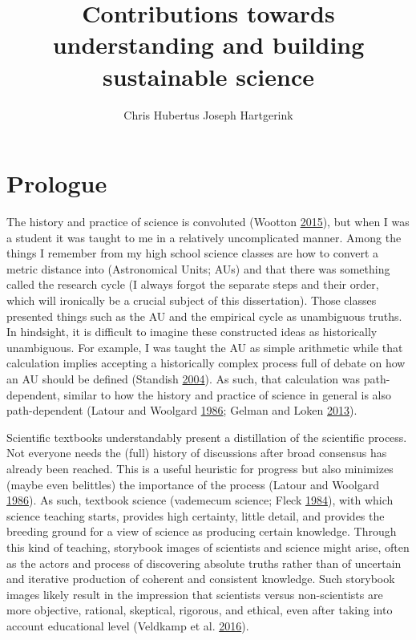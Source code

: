 \documentclass[a5paper]{book}
\title{Contributions towards understanding and building sustainable science}
\author{Chris Hubertus Joseph Hartgerink}
\date{}
\begin{document}
\maketitle

{
\setcounter{tocdepth}{1}
\tableofcontents
}
\chapter*{Prologue}\label{prologue}

The history and practice of science is convoluted (Wootton
\protect\hyperlink{ref-isbn:9781846142109}{2015}), but when I was a
student it was taught to me in a relatively uncomplicated manner. Among
the things I remember from my high school science classes are how to
convert a metric distance into (Astronomical Units; AUs) and that there
was something called the research cycle (I always forgot the separate
steps and their order, which will ironically be a crucial subject of
this dissertation). Those classes presented things such as the AU and
the empirical cycle as unambiguous truths. In hindsight, it is difficult
to imagine these constructed ideas as historically unambiguous. For
example, I was taught the AU as simple arithmetic while that calculation
implies accepting a historically complex process full of debate on how
an AU should be defined (Standish
\protect\hyperlink{ref-doi:10.1017ux2fs1743921305001365}{2004}). As
such, that calculation was path-dependent, similar to how the history
and practice of science in general is also path-dependent (Latour and
Woolgard \protect\hyperlink{ref-isbn:0692094187}{1986}; Gelman and Loken
\protect\hyperlink{ref-gelman-forking}{2013}).

Scientific textbooks understandably present a distillation of the
scientific process. Not everyone needs the (full) history of discussions
after broad consensus has already been reached. This is a useful
heuristic for progress but also minimizes (maybe even belittles) the
importance of the process (Latour and Woolgard
\protect\hyperlink{ref-isbn:0692094187}{1986}). As such, textbook
science (vademecum science; Fleck
\protect\hyperlink{ref-isbn:9780226253251}{1984}), with which science
teaching starts, provides high certainty, little detail, and provides
the breeding ground for a view of science as producing certain
knowledge. Through this kind of teaching, storybook images of scientists
and science might arise, often as the actors and process of discovering
absolute truths rather than of uncertain and iterative production of
coherent and consistent knowledge. Such storybook images likely result
in the impression that scientists versus non-scientists are more
objective, rational, skeptical, rigorous, and ethical, even after taking
into account educational level (Veldkamp et al.
\protect\hyperlink{ref-doi:10.1080ux2f08989621.2016.1268922}{2016}).
\end{document}
